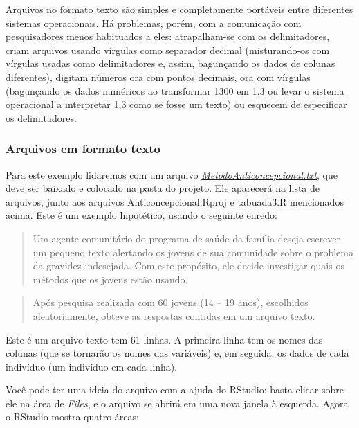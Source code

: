 \documentclass[
]{article}
\begin{document}
Arquivos no formato texto são simples e completamente portáveis entre
diferentes sistemas operacionais. Há problemas, porém, com a comunicação
com pesquisadores menos habituados a eles: atrapalham-se com os
delimitadores, criam arquivos usando vírgulas como separador decimal
(misturando-os com vírgulas usadas como delimitadores e, assim,
bagunçando os dados de colunas diferentes), digitam números ora com
pontos decimais, ora com vírgulas (bagunçando os dados numéricos ao
transformar 1300 em 1.3 ou levar o sistema operacional a interpretar 1,3
como se fosse um texto) ou esquecem de especificar os delimitadores.

\hypertarget{arquivos-em-formato-texto}{%
\subsubsection{Arquivos em formato
texto}\label{arquivos-em-formato-texto}}

Para este exemplo lidaremos com um arquivo
\emph{\url{MetodoAnticoncepcional.txt}}, que deve ser baixado e colocado
na pasta do projeto. Ele aparecerá na lista de arquivos, junto aos
arquivos Anticoncepcional.Rproj e tabuada3.R mencionados acima. Este é
um exemplo hipotético, usando o seguinte enredo:

\begin{quote}
Um agente comunitário do programa de saúde da família deseja escrever um
pequeno texto alertando os jovens de sua comunidade sobre o problema da
gravidez indesejada. Com este propósito, ele decide investigar quais os
métodos que os jovens estão usando.
\end{quote}

\begin{quote}
Após pesquisa realizada com 60 jovens (14 -- 19 anos), escolhidos
aleatoriamente, obteve as respostas contidas em um arquivo texto.
\end{quote}

Este é um arquivo texto tem 61 linhas. A primeira linha tem os nomes das
colunas (que se tornarão os nomes das variáveis) e, em seguida, os dados
de cada indivíduo (um indivíduo em cada linha).

Você pode ter uma ideia do arquivo com a ajuda do RStudio: basta clicar
sobre ele na área de \emph{Files}, e o arquivo se abrirá em uma nova
janela à esquerda. Agora o RStudio mostra quatro áreas:
\end{document}
